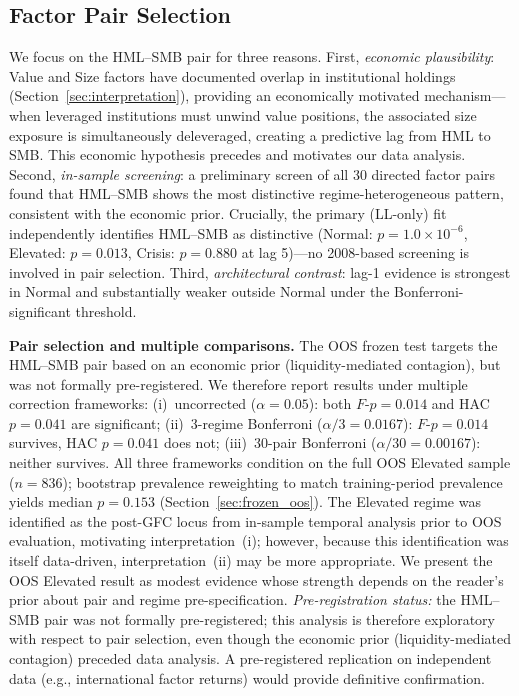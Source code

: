 \documentclass[sigconf,anonymous]{acmart}
\begin{document}
\subsection{Factor Pair Selection}
\label{sec:pairselection}

We focus on the HML--SMB pair for three reasons. First, \emph{economic
plausibility}: Value and Size factors have documented overlap in institutional
holdings (Section~\ref{sec:interpretation}), providing an economically motivated
mechanism---when leveraged institutions must unwind value positions, the associated
size exposure is simultaneously deleveraged, creating a predictive lag from HML
to SMB. This economic hypothesis precedes and motivates our data analysis.
Second, \emph{in-sample screening}: a preliminary screen of all 30 directed
factor pairs found that HML--SMB shows the most distinctive regime-heterogeneous
pattern, consistent with the economic prior. Crucially, the primary (LL-only) fit
independently identifies HML--SMB as distinctive (Normal: $p = 1.0 \times 10^{-6}$,
Elevated: $p = 0.013$, Crisis: $p = 0.880$ at lag 5)---no 2008-based screening is
involved in pair selection.
Third, \emph{architectural contrast}: lag-1 evidence is strongest in Normal and
substantially weaker outside Normal under the Bonferroni-significant threshold.

\textbf{Pair selection and multiple comparisons.} The OOS frozen test targets
the HML--SMB pair based on an economic prior (liquidity-mediated contagion),
but was not formally pre-registered. We therefore report results under
multiple correction frameworks:
(i)~uncorrected ($\alpha = 0.05$): both $F$-$p = 0.014$ and HAC $p = 0.041$ are significant;
(ii)~3-regime Bonferroni ($\alpha/3 = 0.0167$): $F$-$p = 0.014$ survives, HAC $p = 0.041$ does not;
(iii)~30-pair Bonferroni ($\alpha/30 = 0.00167$): neither survives.
All three frameworks condition on the full OOS Elevated sample ($n = 836$);
bootstrap prevalence reweighting to match training-period prevalence
yields median $p = 0.153$ (Section~\ref{sec:frozen_oos}).
The Elevated regime was identified as the post-GFC locus from in-sample temporal
analysis prior to OOS evaluation, motivating interpretation~(i); however, because
this identification was itself data-driven, interpretation~(ii) may be more
appropriate. We present the OOS Elevated result as modest evidence whose
strength depends on the reader's prior about pair and regime pre-specification.
\emph{Pre-registration status:} the HML--SMB pair was not formally pre-registered;
this analysis is therefore exploratory with respect to pair selection, even
though the economic prior (liquidity-mediated contagion) preceded data analysis.
A pre-registered replication on independent data (e.g., international factor
returns) would provide definitive confirmation.
\end{document}
